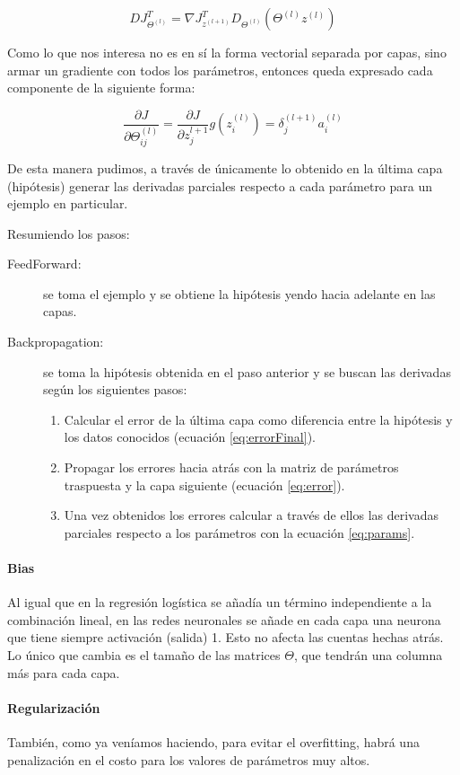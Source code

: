\begin{equation}
D J_{\Theta^{(l)}}^T = \nabla J_{z^{(l+1)}}^T D_{\Theta^{(l)}} (\Theta^{(l)} z^{(l)})
\end{equation}

Como lo que nos interesa no es en sí la forma vectorial separada por capas, sino armar un gradiente con todos los parámetros, entonces queda expresado cada componente de la siguiente forma:

\begin{equation} \label{eq:params}
\frac{\partial J}{\partial \Theta_{ij}^{(l)}} = \frac{\partial J}{\partial z_j^{l+1}}g(z_i^{(l)}) = \delta_j^{(l+1)}a_i^{(l)}
\end{equation}

De esta manera pudimos, a través de únicamente lo obtenido en la última capa (hipótesis) generar las derivadas parciales respecto a cada parámetro para un ejemplo en particular.

Resumiendo los pasos:
\begin{description}
\item[FeedForward:] se toma el ejemplo y se obtiene la hipótesis yendo hacia adelante en las capas.
\item[Backpropagation:] se toma la hipótesis obtenida en el paso anterior y se buscan las derivadas según los siguientes pasos:
	\begin{enumerate}
	\item Calcular el error de la última capa como diferencia entre la hipótesis y los datos conocidos (ecuación \ref{eq:errorFinal}).
	\item Propagar los errores hacia atrás con la matriz de parámetros traspuesta y la capa siguiente (ecuación \ref{eq:error}).
	\item Una vez obtenidos los errores calcular a través de ellos las derivadas parciales respecto a los parámetros con la ecuación \ref{eq:params}.
	
	\end{enumerate}
\end{description}

\paragraph{Bias} Al igual que en la regresión logística se añadía un término independiente a la combinación lineal, en las redes neuronales se añade en cada capa una neurona que tiene siempre activación (salida) 1. Esto no afecta las cuentas hechas atrás. Lo único que cambia es el tamaño de las matrices $\Theta$, que tendrán una columna más para cada capa.

\paragraph{Regularización} También, como ya veníamos haciendo, para evitar el overfitting, habrá una penalización en el costo para los valores de parámetros muy altos.